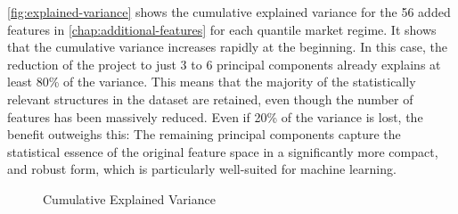 \autoref{fig:explained-variance} shows the cumulative explained variance for the 56 added features in \autoref{chap:additional-features} for each quantile market regime.
It shows that the cumulative variance increases rapidly at the beginning.
In this case, the reduction of the project to just 3 to 6 principal components already explains at least 80\% of the variance.
This means that the majority of the statistically relevant structures in the dataset are retained, even though the number of features has been massively reduced.
Even if 20\% of the variance is lost, the benefit outweighs this: The remaining principal components capture the statistical essence of the original feature space in a significantly more compact, and robust form, which is particularly well-suited for machine learning.


\begin{figure}[H]
    \centering
    
    \caption{Cumulative Explained Variance}
    \label{fig:explained-variance}
\end{figure}

